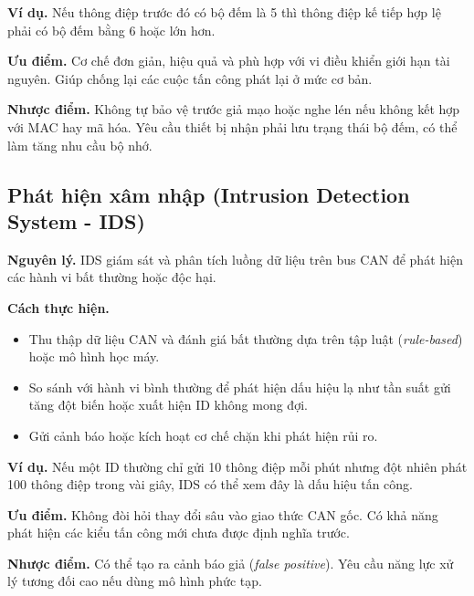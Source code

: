 \textbf{Ví dụ.} Nếu thông điệp trước đó có bộ đếm là 5 thì thông điệp kế tiếp hợp lệ phải có bộ đếm bằng 6 hoặc lớn hơn.

\textbf{Ưu điểm.} Cơ chế đơn giản, hiệu quả và phù hợp với vi điều khiển giới hạn tài nguyên. Giúp chống lại các cuộc tấn công phát lại ở mức cơ bản.

\textbf{Nhược điểm.} Không tự bảo vệ trước giả mạo hoặc nghe lén nếu không kết hợp với MAC hay mã hóa. Yêu cầu thiết bị nhận phải lưu trạng thái bộ đếm, có thể làm tăng nhu cầu bộ nhớ.

\subsection{Phát hiện xâm nhập (Intrusion Detection System - IDS)}
\textbf{Nguyên lý.} IDS giám sát và phân tích luồng dữ liệu trên bus CAN để phát hiện các hành vi bất thường hoặc độc hại.

\textbf{Cách thực hiện.}
\begin{itemize}[leftmargin=*]
    \item Thu thập dữ liệu CAN và đánh giá bất thường dựa trên tập luật (\textit{rule-based}) hoặc mô hình học máy.
    \item So sánh với hành vi bình thường để phát hiện dấu hiệu lạ như tần suất gửi tăng đột biến hoặc xuất hiện ID không mong đợi.
    \item Gửi cảnh báo hoặc kích hoạt cơ chế chặn khi phát hiện rủi ro.
\end{itemize}

\textbf{Ví dụ.} Nếu một ID thường chỉ gửi 10 thông điệp mỗi phút nhưng đột nhiên phát 100 thông điệp trong vài giây, IDS có thể xem đây là dấu hiệu tấn công.

\textbf{Ưu điểm.} Không đòi hỏi thay đổi sâu vào giao thức CAN gốc. Có khả năng phát hiện các kiểu tấn công mới chưa được định nghĩa trước.

\textbf{Nhược điểm.} Có thể tạo ra cảnh báo giả (\textit{false positive}). Yêu cầu năng lực xử lý tương đối cao nếu dùng mô hình phức tạp.

